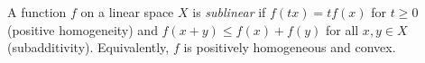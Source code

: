 A function $f$ on a linear space $X$ is \emph{sublinear} if $f(tx) = tf(x)$ for $t \geqslant 0$ (positive homogeneity) and $f(x+y) \leqslant f(x) + f(y)$ for all $x,y \in X$ (subadditivity). Equivalently, $f$ is positively homogeneous and convex.
